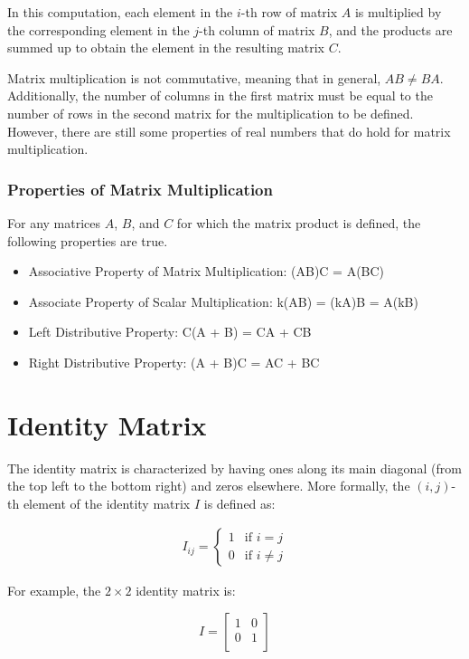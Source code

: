 \documentclass[11pt]{article}
\begin{document}
In this computation, each element in the $i$-th row of matrix $A$ is multiplied by the corresponding element in the $j$-th column of matrix $B$, and the products are summed up to obtain the element in the resulting matrix $C$.

Matrix multiplication is not commutative, meaning that in general, $AB \neq BA$. Additionally, the number of columns in the first matrix must be equal to the number of rows in the second matrix for the multiplication to be defined. However, there are still some properties of real numbers that do hold for matrix multiplication.

\subsubsection*{Properties of Matrix Multiplication}
For any matrices $A$, $B$, and $C$ for which the matrix product is defined, the following properties are true.
\begin{itemize}
    \item Associative Property of Matrix Multiplication: (AB)C = A(BC) 
    \item Associate Property of Scalar Multiplication: k(AB) = (kA)B = A(kB)
    \item Left Distributive Property: C(A + B) = CA + CB 
    \item Right Distributive Property: (A + B)C = AC + BC
\end{itemize}

\section{Identity Matrix}
The identity matrix is characterized by having ones along its main diagonal (from the top left to the bottom right) and zeros elsewhere. More formally, the $(i, j)$-th element of the identity matrix $I$ is defined as:

\begin{align*}
    I_{ij} = \begin{cases} 
          1 & \text{if } i = j \\
          0 & \text{if } i \neq j
       \end{cases}    
\end{align*}

For example, the $2 \times 2$ identity matrix is:

\[
I = \begin{bmatrix}
1 & 0 \\
0 & 1 \\
\end{bmatrix}
\]
\end{document}
